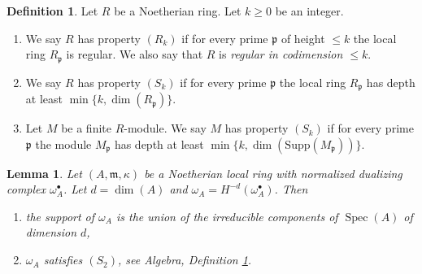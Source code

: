 \documentclass{amsart}
\theoremstyle{plain}
\newtheorem{lemma}[subsection]{Lemma}
\theoremstyle{definition}
\newtheorem{definition}[subsection]{Definition}
\theoremstyle{remark}
\numberwithin{equation}{subsection}
\def\Spec{\mathop{\mathrm{Spec}}}
\begin{document}
\begin{definition}
\label{algebra-definition-conditions}
Let $R$ be a Noetherian ring.
Let $k \geq 0$ be an integer.
\begin{enumerate}
\item We say $R$ has property {\it $(R_k)$} if for every prime $\mathfrak p$
of height $\leq k$ the local ring $R_{\mathfrak p}$ is regular.
We also say that $R$ is {\it regular in codimension $\leq k$}.
\item We say $R$ has property {\it $(S_k)$} if for every prime $\mathfrak p$
the local ring $R_{\mathfrak p}$ has depth at least
$\min\{k, \dim(R_{\mathfrak p})\}$.
\item Let $M$ be a finite $R$-module. We say $M$ has property $(S_k)$
if for every prime $\mathfrak p$ the module
$M_{\mathfrak p}$ has depth at least
$\min\{k, \dim(\text{Supp}(M_{\mathfrak p}))\}$.
\end{enumerate}
\end{definition}

\begin{lemma}
\label{lemma-depth-dualizing-module}
Let $(A, \mathfrak m, \kappa)$ be a Noetherian local ring with
normalized dualizing complex $\omega_A^\bullet$. Let $d = \dim(A)$
and $\omega_A = H^{-d}(\omega_A^\bullet)$. Then
\begin{enumerate}
\item the support of $\omega_A$ is the union of the irreducible components
of $\Spec(A)$ of dimension $d$,
\item $\omega_A$ satisfies $(S_2)$, see
Algebra, Definition \ref{algebra-definition-conditions}.
\end{enumerate}
\end{lemma}
\end{document}

